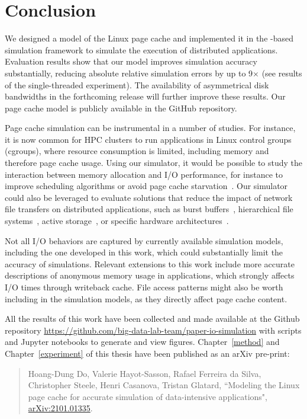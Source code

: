 \chapter{Conclusion}
\label{conclusion}

We designed a model of the Linux page cache and implemented it in the
\simgrid-based \wrench simulation framework to simulate the execution
of distributed applications.
Evaluation results show that our model improves simulation accuracy
substantially, reducing absolute relative simulation errors by up to
9$\times$ (see results of the single-threaded experiment). The
availability of asymmetrical disk bandwidths in the forthcoming
\simgrid release will further improve these results.
Our page cache model is publicly available in the \wrench GitHub
repository.

Page cache simulation can be instrumental in a number of studies. For
instance, it is now common for HPC clusters to run applications in
Linux control groups (cgroups), where resource consumption is limited,
including memory and therefore page cache usage. Using our simulator,
it would be possible to study the interaction between memory allocation
and I/O performance, for instance to improve scheduling algorithms or
avoid page cache starvation~\cite{zhuang2017}. Our simulator could also
be leveraged to evaluate solutions that reduce the impact of network
file transfers on distributed applications, such as burst
buffers~\cite{ferreiradasilva-fgcs-bb-2019}, hierarchical file
systems~\cite{islam2015triple}, active storage~\cite{5496981}, or
specific hardware architectures~\cite{hayot2020performance}. 

Not all I/O behaviors are captured by currently available simulation models,
including the one developed in this work, 
which could substantially limit the accuracy of simulations.
Relevant extensions to this work include more
accurate descriptions of anonymous memory usage in applications, 
which strongly affects I/O times through writeback cache. File access patterns
 might also be worth including in the simulation models,
as they directly affect page cache content.

All the results of this work have been collected and made available at the Github repository 
\url{https://github.com/big-data-lab-team/paper-io-simulation} 
with scripts and Jupyter notebooks to generate and view figures. 
Chapter~\ref{method} and Chapter~\ref{experiment} of this thesis have been 
published as an arXiv pre-print:

\begin{quote}
    Hoang-Dung Do, Valerie Hayot-Sasson, Rafael Ferreira da Silva,
    Christopher Steele, Henri Casanova, Tristan Glatard, ``Modeling the
    Linux page cache for accurate simulation of data-intensive
    applications", \href{https://arxiv.org/abs/2101.01335}{arXiv:2101.01335}. 
\end{quote}
